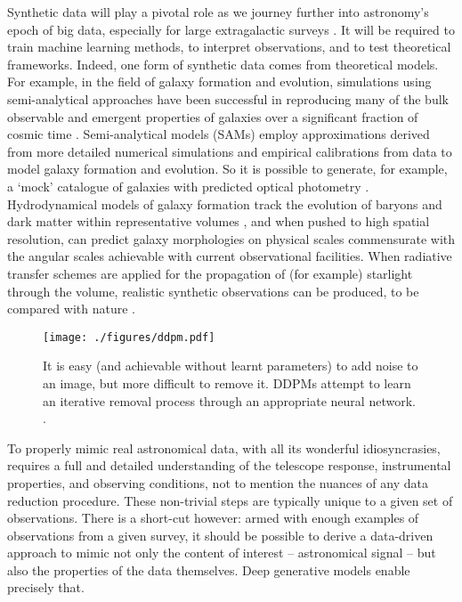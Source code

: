 \documentclass[fleqn,usenatbib]{mnras}
\begin{document}
Synthetic data will play a pivotal role as we journey further into astronomy's
epoch of big data, especially for large extragalactic surveys
\citep{cite_sdss,cite_ska,cite_euclid,cite_lsst}.  It will be required to train
machine learning methods, to interpret observations, and to test theoretical
frameworks. Indeed, one form of synthetic data comes from theoretical models.
For example, in the field of galaxy formation and evolution, simulations using
semi-analytical approaches have been successful in reproducing many of the bulk
observable and emergent properties of galaxies over a significant fraction of
cosmic time
\citep[e.g.][]{cite_somerville1999,cite_cole2000,cite_bower2006,cite_croton2006}.
Semi-analytical models (SAMs) employ approximations derived from more detailed
numerical simulations and empirical calibrations from data to model galaxy
formation and evolution. So it is possible to generate, for example, a `mock'
catalogue of galaxies with predicted optical photometry \citep{cite_lagos2019}.
Hydrodynamical models of galaxy formation track the evolution of baryons and
dark matter within representative volumes
\citep[e.g.][]{cite_dubois2014,cite_vogelsberger2014,cite_eagle,cite_khandai2015,cite_kaviraj2017},
and when pushed to high spatial resolution, can predict galaxy morphologies on
physical scales commensurate with the angular scales achievable with current
observational facilities. When radiative transfer schemes are applied for the
propagation of (for example) starlight through the volume, realistic synthetic
observations can be produced, to be compared with nature
\citep[e.g.][]{cite_camps2016,cite_trayford2017,cite_lovell2021}.

\begin{figure*}
    \texttt{[image: ./figures/ddpm.pdf]}
    \caption{It is easy (and achievable without learnt parameters) to add noise
    to an image, but more difficult to remove it. DDPMs attempt to learn an
    iterative removal process through an appropriate neural network.
    .}
    \label{fig_ddpm}
\end{figure*}
   
To properly mimic real astronomical data, with all its wonderful
idiosyncrasies, requires a full and detailed understanding of the telescope
response, instrumental properties, and observing conditions, not to mention the
nuances of any data reduction procedure. These non-trivial steps are
typically unique to a given set of observations. There is a short-cut however:
armed with enough examples of observations from a given survey, it should be
possible to derive a data-driven approach to mimic not only the content of
interest -- astronomical signal -- but also the properties of the data themselves.
Deep generative models enable precisely that.
\end{document}
